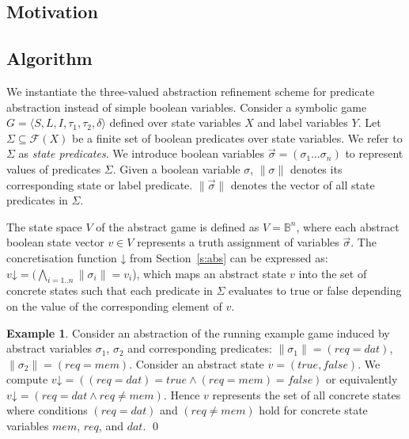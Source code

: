 \documentclass{book}
\newcommand{\concrete}[1]{#1\mathord{\downarrow}}
\newcommand{\forms}[0]{\mathcal{F}}
\newcommand{\vect}[1]{\vec{#1}}
\theoremstyle{definition}
\newtheorem*{ex}{Example}
\begin{document}
\subsection{Motivation}
\subsection{Algorithm}

We instantiate the three-valued abstraction refinement scheme for predicate abstraction instead of simple boolean variables. Consider a symbolic game $G = \langle S, L, I, \tau_1, \tau_2, \delta \rangle$ defined over state variables $X$ and label variables $Y$. Let $\Sigma\subseteq\forms(X)$ be a finite set of boolean predicates over state variables. We refer to $\Sigma$ as \emph{state predicates}. We introduce boolean variables $\vect{\sigma}=(\sigma_1\ldots\sigma_n)$ to represent values of predicates $\Sigma$. Given a boolean variable $\sigma$, $\|\sigma\|$ denotes its corresponding state or label predicate. $\|\vect{\sigma}\|$ denotes the vector of all state predicates in $\Sigma$.


The state space $V$ of the abstract game is defined as $V = \mathbb{B}^n$, where each abstract boolean state vector $v\in V$ represents a truth assignment of variables $\vect{\sigma}$. The concretisation function $\concrete{}$ from Section~\ref{s:abs} can be expressed as: $\concrete{v}=(\bigwedge_{i=1..n}\|\sigma_i\|=v_i$), which maps an abstract state $v$ into the set of concrete states such that each predicate in $\Sigma$ evaluates to true or false depending on the value of the corresponding element of $v$.

\begin{ex}
    \everymath{\mathtt{\xdef\tmp{\fam\the\fam\relax}\aftergroup\tmp}}
    \everydisplay{\mathtt{\xdef\tmp{\fam\the\fam\relax}\aftergroup\tmp}}
    Consider an abstraction of the running example game induced by abstract variables $\sigma_1$, $\sigma_2$ and corresponding predicates: $\|\sigma_1\| = (req=dat)$, $\|\sigma_2\| = (req = mem)$.  Consider an abstract state $v=(true,false)$. We compute $\concrete{v} = ((req=dat) = true \land (req = mem)=false)$ or equivalently $\concrete{v} = (req=dat \land req \neq mem)$.  Hence $v$ represents the set of all concrete states where conditions $(req=dat)$ and  $(req \neq mem)$ hold for concrete state variables $mem$, $req$, and $dat$.
    \qed
\end{ex}
\end{document}
